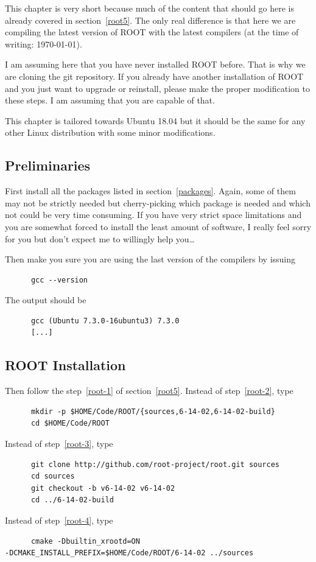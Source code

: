 This chapter is very short because much of the content that should go
here is already covered in section~\ref{root5}. The only real
difference is that here we are compiling the latest version of ROOT with
the latest compilers (at the time of writing: \today).

I am assuming here that you have never installed ROOT before. That is
why we are cloning the git repository. If you already have another
installation of ROOT and you just want to upgrade or reinstall, please
make the proper modification to these steps. I am assuming that you
are capable of that.

This chapter is tailored towards Ubuntu 18.04 but it should be the
same for any other Linux distribution with some minor modifications.

\subsection{Preliminaries} First install all the packages listed in
section~\ref{packages}. Again, some of them may not be strictly needed
but cherry-picking which package is needed and which not could be very
time consuming. If you have very strict space limitations and you are
somewhat forced to install the least amount of software, I really feel
sorry for you but don't expect me to willingly help you\dots

Then make you sure you are using the last version of the compilers by
issuing
\begin{lstlisting}
      gcc --version
\end{lstlisting}
The output should be
\begin{lstlisting}
      gcc (Ubuntu 7.3.0-16ubuntu3) 7.3.0
      [...]
\end{lstlisting}

\subsection{ROOT Installation}

Then follow the step~\ref{root-1} of section~\ref{root5}. Instead of step~\ref{root-2}, type
\begin{lstlisting}
      mkdir -p $HOME/Code/ROOT/{sources,6-14-02,6-14-02-build}
      cd $HOME/Code/ROOT
\end{lstlisting}
Instead of step~\ref{root-3}, type
\begin{lstlisting}
      git clone http://github.com/root-project/root.git sources
      cd sources
      git checkout -b v6-14-02 v6-14-02
      cd ../6-14-02-build
\end{lstlisting}
Instead of step~\ref{root-4}, type
\begin{lstlisting}
      cmake -Dbuiltin_xrootd=ON
-DCMAKE_INSTALL_PREFIX=$HOME/Code/ROOT/6-14-02 ../sources
\end{lstlisting}

